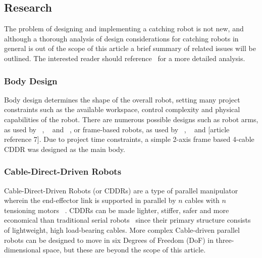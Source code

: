\documentclass[conference]{IEEEtran}
\begin{document}
\subsection{Research}\label{research}
The problem of designing and implementing a catching robot is not new, and although a thorough analysis of design considerations for catching robots in general is out of the scope of this article a brief summary of related issues will be outlined. The interested reader should reference~\cite{Sorg2003VisualTA} for a more detailed analysis.

\subsubsection{Body Design}
Body design determines the shape of the overall robot, setting many project constraints such as the available workspace, control complexity and physical capabilities of the robot. There are numerous possible designs such as robot arms, as used by ~\cite{6810147}, ~\cite{malzahn2014modeling} and ~\cite{5980073}, or frame-based robots, as used by ~\cite{6385963}, ~\cite{forpheus} and [article reference 7]. Due to project time constraints, a simple 2-axis frame based 4-cable CDDR was designed as the main body.

\subsubsection{Cable-Direct-Driven Robots}
Cable-Direct-Driven Robots (or CDDRs) are a type of parallel manipulator wherein the end-effector link is supported in parallel by $n$ cables with $n$ tensioning motors ~\cite{CDDR:description}. CDDRs can be made lighter, stiffer, safer and more economical than traditional serial robots~\cite{WilliamsII2003} since their primary structure consists of lightweight, high load-bearing cables. More complex Cable-driven parallel robots can be designed to move in six Degrees of Freedom (DoF) in three-dimensional space, but these are beyond the scope of this article. 
\end{document}
